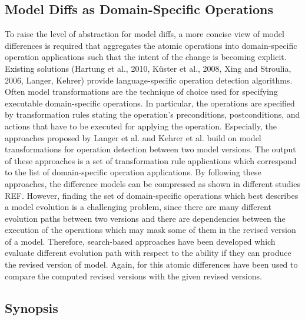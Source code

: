 \subsection{Model Diffs as Domain-Specific Operations}

To raise the level of abstraction for model diffs, a more concise view of model differences is required that aggregates the atomic operations into domain-specific operation applications such that the intent of the change is becoming explicit. Existing solutions (Hartung et al., 2010, Küster et al., 2008, Xing and Stroulia, 2006, Langer, Kehrer) provide language-specific operation detection algorithms. Often model transformations are the technique of choice used for specifying executable domain-specific operations. In particular, the operations are specified by transformation rules stating the operation's preconditions, postconditions, and actions that have to be executed for applying the operation. Especially, the approaches  proposed by Langer et al. and Kehrer et al. build on model transformations for operation detection between two model versions. The output of these approaches is a set of transformation rule applications which correspond to the list of domain-specific operation applications. By following these approaches, the difference models can be compressed as shown in different studies REF. However, finding the set of domain-specific operations which best describes a model evolution is a challenging problem, since there are many different evolution paths between two versions and there are dependencies between the execution of the operations which may mask some of them in the revised version of a model. Therefore, search-based approaches have been developed which evaluate different evolution path with respect to the ability if they can produce the revised version of model. Again, for this atomic differences have been used to compare the computed revised versions with the given revised versions. 

\subsection{Synopsis}

